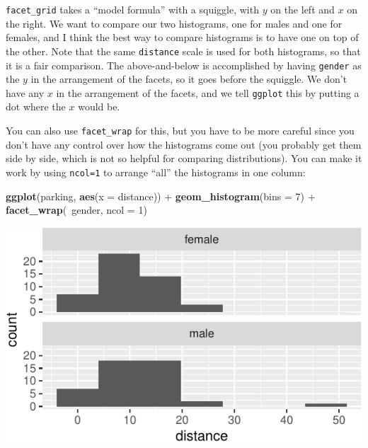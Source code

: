 \documentclass[]{tufte-book}
\newenvironment{Shaded}{}{}
\newcommand{\DataTypeTok}[1]{\textcolor[rgb]{0.56,0.13,0.00}{#1}}
\newcommand{\DecValTok}[1]{\textcolor[rgb]{0.25,0.63,0.44}{#1}}
\newcommand{\KeywordTok}[1]{\textcolor[rgb]{0.00,0.44,0.13}{\textbf{#1}}}
\newcommand{\NormalTok}[1]{#1}
\newcommand{\OperatorTok}[1]{\textcolor[rgb]{0.40,0.40,0.40}{#1}}
\newcommand{\StringTok}[1]{\textcolor[rgb]{0.25,0.44,0.63}{#1}}
\theoremstyle{definition}
\theoremstyle{definition}
\theoremstyle{definition}
\theoremstyle{remark}
\begin{document}
\texttt{facet\_grid} takes a ``model formula'' with a squiggle, with
\(y\) on the left and \(x\) on the right. We want to compare our two
histograms, one for males and one for females, and I think the best way
to compare histograms is to have one on top of the other. Note that the
same \texttt{distance} scale is used for both histograms, so that it is
a fair comparison. The above-and-below is accomplished by having
\texttt{gender} as the \(y\) in the arrangement of the facets, so it
goes before the squiggle. We don't have any \(x\) in the arrangement of
the facets, and we tell \texttt{ggplot} this by putting a dot where the
\(x\) would be.

You can also use \texttt{facet\_wrap} for this, but you have to be more
careful since you don't have any control over how the histograms come
out (you probably get them side by side, which is not so helpful for
comparing distributions). You can make it work by using \texttt{ncol=1}
to arrange ``all'' the histograms in one column:

\begin{Shaded}
\begin{Highlighting}[]
\KeywordTok{ggplot}\NormalTok{(parking, }\KeywordTok{aes}\NormalTok{(}\DataTypeTok{x =}\NormalTok{ distance)) }\OperatorTok{+}\StringTok{ }\KeywordTok{geom_histogram}\NormalTok{(}\DataTypeTok{bins =} \DecValTok{7}\NormalTok{) }\OperatorTok{+}\StringTok{ }
\StringTok{    }\KeywordTok{facet_wrap}\NormalTok{(}\OperatorTok{~}\NormalTok{gender, }\DataTypeTok{ncol =} \DecValTok{1}\NormalTok{)}
\end{Highlighting}
\end{Shaded}

\includegraphics{05-two-sample-inference_files/figure-latex/unnamed-chunk-21-1}
\end{document}

